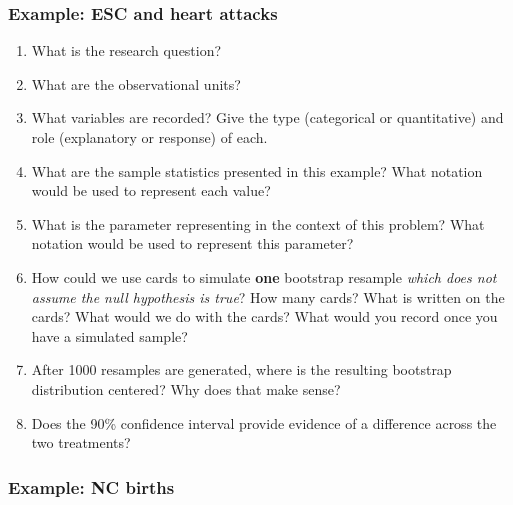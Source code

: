 \documentclass[
]{report}
\newcommand{\rgs}{\vspace{12pt}} %
\begin{document}
\hypertarget{example-esc-and-heart-attacks}{%
\subsubsection*{Example: ESC and heart attacks}\label{example-esc-and-heart-attacks}}

\begin{enumerate}
\def\labelenumi{\arabic{enumi}.}
\item
  What is the research question?
  \rgs
\item
  What are the observational units?
  \rgs
\item
  What variables are recorded? Give the type (categorical or quantitative) and role (explanatory or response) of each.
  \rgs
  \rgs
\item
  What are the sample statistics presented in this example? What notation would be used to represent each value?
  \rgs
\item
  What is the parameter representing in the context of this problem? What notation would be used to represent this parameter?
  \rgs
  \rgs
\item
  How could we use cards to simulate \textbf{one} bootstrap resample \emph{which does not assume the null hypothesis is true}? How many cards? What is written on the cards? What would we do with the cards? What would you record once you have a simulated sample?
  \rgs
  \rgs
  \rgs
\item
  After 1000 resamples are generated, where is the resulting bootstrap distribution centered? Why does that make sense?
  \rgs
  \rgs
\item
  Does the 90\% confidence interval provide evidence of a difference across the two treatments?
  \rgs
  \rgs
\end{enumerate}

\hypertarget{example-nc-births}{%
\subsubsection*{Example: NC births}\label{example-nc-births}}
\end{document}
